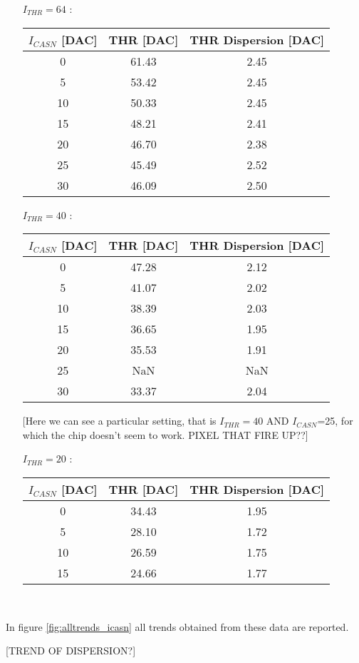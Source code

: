\begin{itemize}
\item[$I_{THR}=64$]:

\begin{tabular}{c | c | c}
$I_{CASN}$ [DAC] & THR [DAC] & THR Dispersion [DAC]\\
\hline
0 & 61.43 & 2.45\\
5 & 53.42 & 2.45\\
10 & 50.33 & 2.45\\
15 & 48.21 & 2.41\\
20 & 46.70 & 2.38\\
25 & 45.49 & 2.52\\
30 & 46.09 & 2.50
\end{tabular}

\item[$I_{THR}=40$]:

\begin{tabular}{c | c | c}
$I_{CASN}$ [DAC] & THR [DAC] & THR Dispersion [DAC]\\
\hline
0 & 47.28 & 2.12\\
5 & 41.07 & 2.02\\
10 & 38.39 & 2.03\\
15 & 36.65 & 1.95\\
20 & 35.53 & 1.91\\
25 & NaN & NaN\\
30 & 33.37 & 2.04
\end{tabular}

[Here we can see a particular setting, that is $I_{THR}=40$ AND $I_{CASN}$=25, for which the chip doesn't seem to work.
PIXEL THAT FIRE UP??]

\item[$I_{THR}=20$]:

\begin{tabular}{c | c | c}
$I_{CASN}$ [DAC] & THR [DAC] & THR Dispersion [DAC]\\
\hline
0 & 34.43 & 1.95\\
5 & 28.10& 1.72\\
10 & 26.59 & 1.75\\
15 & 24.66 & 1.77\\
\end{tabular}
\medskip\\

\end{itemize}

In figure \vref{fig:alltrends_icasn} all trends obtained from these data are reported.

[TREND OF DISPERSION?]

